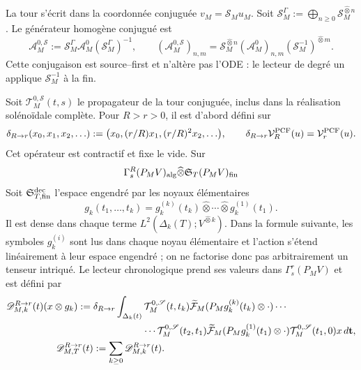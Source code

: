 La tour s'écrit dans la coordonnée conjuguée
$v_M=\mathscr S_Mu_M$. Soit
$\mathscr S_M^{\Gamma}:=\bigoplus_{n\ge0}
\mathscr S_M^{\widehat\otimes n}$. Le générateur homogène conjugué est
\begin{equation}\label{eq:pdf2-ns-conjugated-generator}
 \mathcal A^{0,\mathscr S}_{M}
 :=\mathscr S_M^{\Gamma}\mathcal A^0_M
   (\mathscr S_M^{\Gamma})^{-1},
 \qquad
 (\mathcal A^{0,\mathscr S}_{M})_{n,m}
 =\mathscr S_M^{\widehat\otimes n}
  (\mathcal A^0_M)_{n,m}
  (\mathscr S_M^{-1})^{\widehat\otimes m}.
\end{equation}
Cette conjugaison est source--first et n'altère pas l'ODE : le lecteur de degré un
applique $\mathscr S_M^{-1}$ à la fin.

Soit $\mathcal T_M^{0,\mathscr S}(t,s)$ le propagateur de la tour conjuguée, inclus
dans la réalisation solénoïdale complète. Pour $R>r>0$, il est d'abord défini sur
\begin{equation}\label{eq:pdf2-ns-radial-transfer}
 \delta_{R\to r}(x_0,x_1,x_2,\ldots)
 :=\bigl(x_0,(r/R)x_1,(r/R)^2x_2,\ldots\bigr),
 \qquad
 \delta_{R\to r}\mathcal V_R^{\rm PCF}(u)=\mathcal V_r^{\rm PCF}(u).
\end{equation}
Cet opérateur est contractif et fixe le vide. Sur
\begin{equation}\label{eq:pdf2-ns-dyson-domain}
 \Gamma_s^R(P_MV)_{\rm alg}\widehat\otimes
 \mathfrak S_T(P_MV)_{\rm fin}
\end{equation}
Soit $\mathfrak S_{T,{\rm fin}}^{\rm dec}$ l'espace engendré par les noyaux élémentaires
\[
 g_k(t_1,\ldots,t_k)=
 g_k^{(k)}(t_k)\widehat\otimes\cdots\widehat\otimes g_k^{(1)}(t_1).
\]
Il est dense dans chaque terme $L^2(\Delta_k(T);V^{\widehat\otimes k})$. Dans la
formule suivante, les symboles $g_k^{(i)}$ sont lus dans chaque noyau élémentaire et
l'action s'étend linéairement à leur espace engendré ; on ne factorise donc pas
arbitrairement un tenseur intriqué. Le lecteur chronologique prend ses valeurs dans
$\Gamma_s^r(P_MV)$ et est défini par
\begin{equation}\label{eq:pdf2-ns-dyson-reader}
 \begin{aligned}
 \mathscr D_{M,k}^{R\to r}(t)(x\otimes g_k)
 :={}&\delta_{R\to r}\int_{\Delta_k(t)}
 \mathcal T_M^{0,\mathscr S}(t,t_k)
 \widetilde{\mathcal F}_M(P_Mg_k^{(k)}(t_k)\otimes\cdot)\cdots\\
 &\hspace{18mm}\cdots\mathcal T_M^{0,\mathscr S}(t_2,t_1)
 \widetilde{\mathcal F}_M(P_Mg_k^{(1)}(t_1)\otimes\cdot)
 \mathcal T_M^{0,\mathscr S}(t_1,0)x\,d\mathbf t,\\
 \mathscr D_{M,T}^{R\to r}(t)&:=\sum_{k\geq0}
 \mathscr D_{M,k}^{R\to r}(t).
 \end{aligned}
\end{equation}
